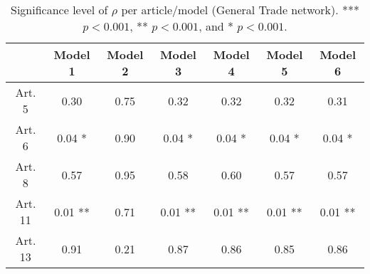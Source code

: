 \begin{table}[ht]
\centering
\begin{tabular}{ccccccc}
  \toprule
 & Model 1 & Model 2 & Model 3 & Model 4 & Model 5 & Model 6 \\ 
  \midrule
Art. 5 & 0.30   & 0.75   & 0.32   & 0.32   & 0.32   & 0.31   \\ 
   \midrule
Art. 6 & 0.04 * & 0.90   & 0.04 * & 0.04 * & 0.04 * & 0.04 * \\ 
   \midrule
Art. 8 & 0.57   & 0.95   & 0.58   & 0.60   & 0.57   & 0.57   \\ 
   \midrule
Art. 11 & 0.01 ** & 0.71   & 0.01 ** & 0.01 ** & 0.01 ** & 0.01 ** \\ 
   \midrule
Art. 13 & 0.91   & 0.21   & 0.87   & 0.86   & 0.85   & 0.86   \\ 
   \bottomrule
\end{tabular}
\caption{Significance level of $\rho$ per article/model (General Trade network). *** $p < 0.001$, ** $p < 0.001$, and * $p < 0.001$.} 
\end{table}
